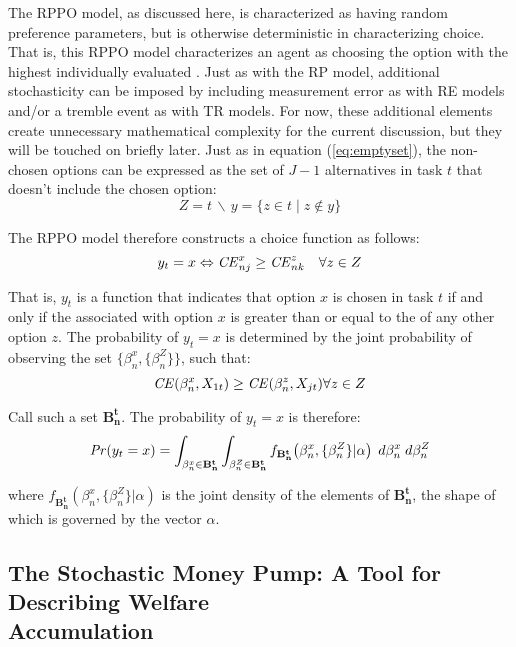 The RPPO model, as discussed here, is characterized as having random preference parameters, but is otherwise deterministic in characterizing choice.
That is, this RPPO model characterizes an agent as choosing the option with the highest individually evaluated {\CE}.
Just as with the RP model, additional stochasticity can be imposed by including measurement error as with RE models and/or a tremble event as with TR models.
For now, these additional elements create unnecessary mathematical complexity for the current discussion, but they will be touched on briefly later.
Just as in equation (\ref{eq:emptyset}), the non-chosen options can be expressed as the set of $J-1$ alternatives in task $t$ that doesn't include the chosen option:
\begin{equation}
	\label{eq:RPPO:emptyset}
	Z = t \,\backslash\, y = \{z \in t \;|\; z \notin y \}
\end{equation}


\noindent The RPPO model therefore constructs a choice function as follows:
\begin{equation}
	\label{RPPO.y0}
	y_t = x \Leftrightarrow {\ensuremath{\mathit{CE}}}_{nj}^x \geq {\ensuremath{\mathit{CE}}}_{nk}^z \quad \forall z \in Z
\end{equation}

That is, $y_t$ is a function that indicates that option $x$ is chosen in task $t$ if and only if the {\CE} associated with option $x$ is greater than or equal to the {\CE} of any other option $z$.
The probability of $y_t = x$ is determined by the joint probability of observing the set $\bigl\{\beta_n^x,\{\beta_n^Z\}\bigr\}$, such that:
\begin{equation}
	\label{eq:RPPO.y1}
	{\ensuremath{\mathit{CE}}}(\beta_n^x,X_{1t}) \geq {\ensuremath{\mathit{CE}}}(\beta_n^z,X_{jt}) \forall z \in Z
\end{equation}

\noindent Call such a set $\mathbf{B^t_n}$.
The probability of $y_t=x$ is therefore:
\begin{equation}
	{\ensuremath{\mathit{Pr}}}(y_t=x) = \int_{\beta_n^x \in \mathbf{B^t_n}}\int_{\beta_n^Z \in \mathbf{B^t_n}} f_{\mathbf{B^t_n}}\!\left(\beta_n^x,\{\beta_n^Z\}|\alpha\right) \;d\beta_n^x \; d\beta_n^Z
\end{equation}

\noindent where $f_{\mathbf{B^t_n}}(\beta_n^x,\{\beta_n^Z\}|\alpha)$ is the joint density of the elements of $\mathbf{B^t_n}$, the shape of which is governed by the vector $\alpha$.

\subsection[The Stochastic Money Pump: A Tool for Describing Welfare \texorpdfstring{\\}{}Accumulation]{The Stochastic Money Pump: A Tool for Describing Welfare\\Accumulation}

